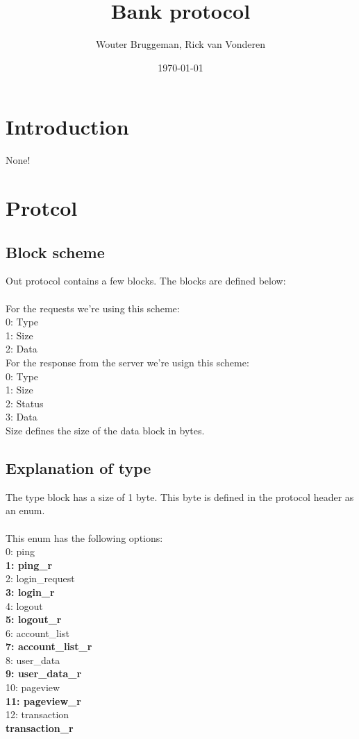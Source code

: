 \documentclass[12pt, a4paper]{article}
\title{Bank protocol}
\author{Wouter Bruggeman, Rick van Vonderen}
\date{\today}
\begin{document}
\maketitle
\newpage

\tableofcontents
\newpage

\section{Introduction}
None!
\newpage

\section{Protcol}
\subsection{Block scheme}
Out protocol contains a few blocks. The blocks are defined below:\\
\\
For the requests we're using this scheme:\\
0: Type\\
1: Size\\
2: Data\\

For the response from the server we're usign this scheme:\\
0: Type\\
1: Size\\
2: Status\\
3: Data\\

Size defines the size of the data block in bytes.

\newpage

\subsection{Explanation of type}
The type block has a size of 1 byte. This byte is defined in the protocol header as
an enum.\\\\
This enum has the following options:\\
0: ping\\
\textbf{1: ping\_r}\\
2: login\_request\\
\textbf{3: login\_r}\\
4: logout\\
\textbf{5: logout\_r}\\
6: account\_list\\
\textbf{7: account\_list\_r}\\
8: user\_data\\
\textbf{9: user\_data\_r}\\
10: pageview\\
\textbf{11: pageview\_r}\\
12: transaction\\
\textbf{transaction\_r}\\
\end{document}
